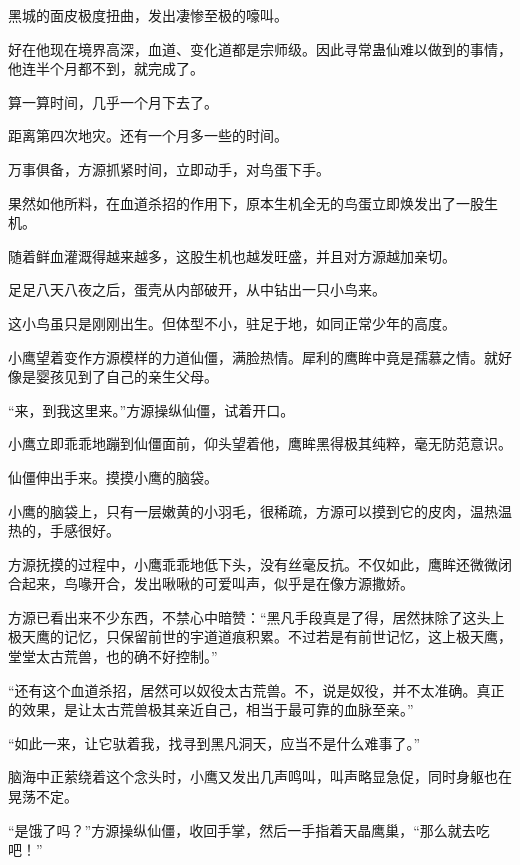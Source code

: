 
\begin{this_body}



黑城的面皮极度扭曲，发出凄惨至极的嚎叫。

好在他现在境界高深，血道、变化道都是宗师级。因此寻常蛊仙难以做到的事情，他连半个月都不到，就完成了。

算一算时间，几乎一个月下去了。

距离第四次地灾。还有一个月多一些的时间。

万事俱备，方源抓紧时间，立即动手，对鸟蛋下手。

果然如他所料，在血道杀招的作用下，原本生机全无的鸟蛋立即焕发出了一股生机。

随着鲜血灌溉得越来越多，这股生机也越发旺盛，并且对方源越加亲切。

足足八天八夜之后，蛋壳从内部破开，从中钻出一只小鸟来。

这小鸟虽只是刚刚出生。但体型不小，驻足于地，如同正常少年的高度。

小鹰望着变作方源模样的力道仙僵，满脸热情。犀利的鹰眸中竟是孺慕之情。就好像是婴孩见到了自己的亲生父母。

“来，到我这里来。”方源操纵仙僵，试着开口。

小鹰立即乖乖地蹦到仙僵面前，仰头望着他，鹰眸黑得极其纯粹，毫无防范意识。

仙僵伸出手来。摸摸小鹰的脑袋。

小鹰的脑袋上，只有一层嫩黄的小羽毛，很稀疏，方源可以摸到它的皮肉，温热温热的，手感很好。

方源抚摸的过程中，小鹰乖乖地低下头，没有丝毫反抗。不仅如此，鹰眸还微微闭合起来，鸟喙开合，发出啾啾的可爱叫声，似乎是在像方源撒娇。

方源已看出来不少东西，不禁心中暗赞：“黑凡手段真是了得，居然抹除了这头上极天鹰的记忆，只保留前世的宇道道痕积累。不过若是有前世记忆，这上极天鹰，堂堂太古荒兽，也的确不好控制。”

“还有这个血道杀招，居然可以奴役太古荒兽。不，说是奴役，并不太准确。真正的效果，是让太古荒兽极其亲近自己，相当于最可靠的血脉至亲。”

“如此一来，让它驮着我，找寻到黑凡洞天，应当不是什么难事了。”

脑海中正萦绕着这个念头时，小鹰又发出几声鸣叫，叫声略显急促，同时身躯也在晃荡不定。

“是饿了吗？”方源操纵仙僵，收回手掌，然后一手指着天晶鹰巢，“那么就去吃吧！”


\end{this_body}
